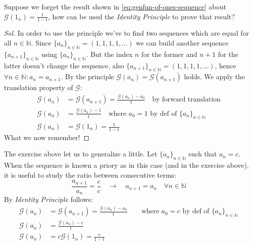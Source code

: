 \begin{exercise}
  Suppose we forget the result shown in
  \autoref{eq:genfun-of-ones-sequence} about $\mathcal{G} (1_n) =
  \frac{1}{1-t} $, how can be used the \emph{Identity Principle} to
  prove that result?
\end{exercise}
\begin{proof}[Sol]
  In order to use the principle we've to find two sequences which are
  equal for all $n \in \mathbb{N} $. Since $\{a_n\}_{n\in\mathbb{N} }
  = (1,1,1,1,\ldots)$ we can build another sequence
  $\{a_{n+1}\}_{n\in\mathbb{N} } $ using $\{a_n\}_{n\in\mathbb{N} }
  $. But the index $n$ for the former and $n+1$ for the latter doesn't
  change the sequence, also $\{a_{n+1}\}_{n\in\mathbb{N} } =
  (1,1,1,1,\ldots)$, hence $\forall n\in \mathbb{N}: a_n =
  a_{n+1}$. By the principle $\mathcal{G} (a_n) = \mathcal{G}
  (a_{n+1})$ holds. We apply the translation property of $\mathcal{G}
  $:
  \begin{displaymath}
    \begin{split}
      \mathcal{G} (a_n) &= \mathcal{G} (a_{n+1}) = \frac{\mathcal{G}
        (a_n) - a_0}{t} \quad \text{by forward translation} \\
      \mathcal{G} (a_n) &= \frac{\mathcal{G}
        (a_n) -1}{t} \quad \text{where } a_0 = 1 \text{ by def of }
      \{a_n\}_{n\in\mathbb{N} }\\
      \mathcal{G} (a_n) &= \mathcal{G} (1_n) = \frac{1}{1-t}
    \end{split}
  \end{displaymath}
  What we now remember!
\end{proof}

The exercise above let us to generalize a little. Let
$\{a_n\}_{n\in\mathbb{N} } $ such that $a_n = c$. When the sequence is
known a priory as in this case (and in the exercise above), it is
useful to study the ratio between consecutive terms:
\begin{displaymath}
   \frac{a_{n+1}}{a_n} =  \frac{c}{c} \quad \rightarrow \quad a_{n+1}
   = a_n \quad \forall n \in \mathbb{N} 
\end{displaymath}
By \emph{Identity Principle} follows:
\begin{displaymath}
  \begin{split}
    \mathcal{G} (a_n) &= \mathcal{G} (a_{n+1}) = \frac{\mathcal{G}
      (a_n) - a_0}{t} \quad \quad \text{where } a_0 = c \text{ by def
      of }
    \{a_n\}_{n\in\mathbb{N} } \\
    \mathcal{G} (a_n) &= \frac{\mathcal{G}
      (a_n) -c}{t} \\
    \mathcal{G} (a_n) &= c\mathcal{G} (1_n) = \frac{c}{1-t}
  \end{split}
\end{displaymath}

